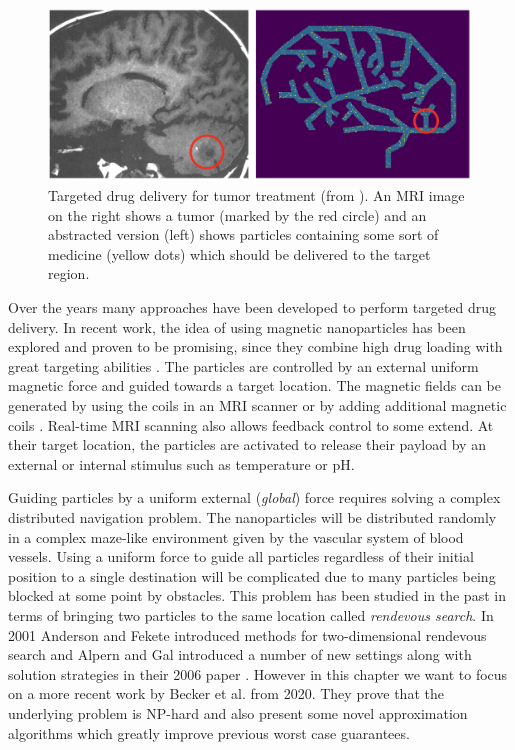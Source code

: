 \begin{figure}[ht]
    
    \begin{center}
        \includegraphics[clip, width=0.7\columnwidth]{figures/drugdelivery/brains.png}
    \end{center}
    
    \caption[Targeted Drug Delivery Example]{Targeted drug delivery for tumor treatment (from \cite{becker2020}). An MRI image on the right shows a tumor (marked by the red circle) and an abstracted version (left) shows particles containing some sort of medicine (yellow dots) which should be delivered to the target region.}
    \label{fig:brain_tumor}
\end{figure}

Over the years many approaches have been developed to perform targeted drug delivery. In recent work, the idea of using magnetic nanoparticles has been explored and proven to be promising, since they combine high drug loading with great targeting abilities \cite{vangijzegem2019magnetic, albinali2019perspective}. The particles are controlled by an external uniform magnetic force and guided towards a target location. The magnetic fields can be generated by using the coils in an MRI scanner \cite{mathieu2007magnetic, pouponneau2009magnetic} or by adding additional magnetic coils \cite{mellal2015magnetic}. Real-time MRI scanning also allows feedback control to some extend. At their target location, the particles are activated to release their payload by an external or internal stimulus such as temperature or pH.

Guiding particles by a uniform external (\textit{global}) force requires solving a complex distributed navigation problem. The nanoparticles will be distributed randomly in a complex maze-like environment given by the vascular system of blood vessels. Using a uniform force to guide all particles regardless of their initial position to a single destination will be complicated due to many particles being blocked at some point by obstacles. This problem has been studied in the past in terms of bringing two particles to the same location called \textit{rendevous search}. In 2001 Anderson and Fekete introduced methods for two-dimensional rendevous search \cite{anderson2001two} and Alpern and Gal introduced a number of new settings along with solution strategies in their 2006 paper \cite{alpern2006theory}. However in this chapter we want to focus on a more recent work by Becker et al. \cite{becker2020} from 2020. They prove that the underlying problem is NP-hard and also present some novel approximation algorithms which greatly improve previous worst case guarantees.


